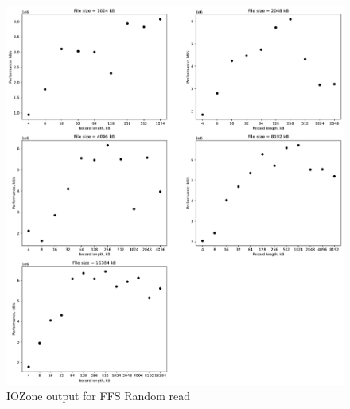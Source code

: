 \begin{figure}[!htb]
	\label{fig:app_bench_ffs_rnd_read}
	\begin{center}
		\includegraphics[width=1.0\textwidth]{figures/benchmarking/ffs/Random read.pdf}
	\end{center}
	\caption{IOZone output for \gls{FFS} Random read}
\end{figure}

